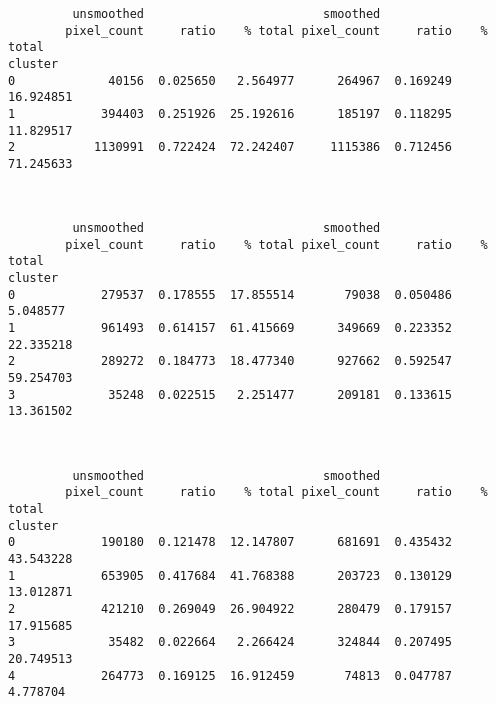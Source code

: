 \documentclass[11pt]{article}
\begin{document}
    
    \begin{verbatim}
         unsmoothed                         smoothed                     
        pixel_count     ratio    % total pixel_count     ratio    % total
cluster                                                                  
0             40156  0.025650   2.564977      264967  0.169249  16.924851
1            394403  0.251926  25.192616      185197  0.118295  11.829517
2           1130991  0.722424  72.242407     1115386  0.712456  71.245633
    \end{verbatim}

    
    \begin{center}
    \end{center}
    { \hspace*{\fill} \\}
    
    
    \begin{verbatim}
         unsmoothed                         smoothed                     
        pixel_count     ratio    % total pixel_count     ratio    % total
cluster                                                                  
0            279537  0.178555  17.855514       79038  0.050486   5.048577
1            961493  0.614157  61.415669      349669  0.223352  22.335218
2            289272  0.184773  18.477340      927662  0.592547  59.254703
3             35248  0.022515   2.251477      209181  0.133615  13.361502
    \end{verbatim}

    
    \begin{center}
    \end{center}
    { \hspace*{\fill} \\}
    
    
    \begin{verbatim}
         unsmoothed                         smoothed                     
        pixel_count     ratio    % total pixel_count     ratio    % total
cluster                                                                  
0            190180  0.121478  12.147807      681691  0.435432  43.543228
1            653905  0.417684  41.768388      203723  0.130129  13.012871
2            421210  0.269049  26.904922      280479  0.179157  17.915685
3             35482  0.022664   2.266424      324844  0.207495  20.749513
4            264773  0.169125  16.912459       74813  0.047787   4.778704
    \end{verbatim}
\end{document}
